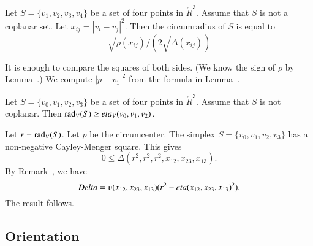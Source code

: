 \begin{tarskidata}
\begin{tarski}

\begin{lemma}
Let $S=\{v_1,v_2,v_3,v_4\}$ be a set of four points in $\ring{R}^3$.
Assume that $S$ is not a coplanar set.  
Let $x_{ij}=|v_i-v_j|^2$.
Then the circumradius of
	$S$ is equal to 
		$$
		\sqrt{\rho(x_{ij})}/
		(2\sqrt{\Delta(x_{ij})})
		$$
\end{lemma}

\begin{proved} It is enough to compare the
squares of both sides.  (We know the sign of
$\rho$ by Lemma~.)  We
compute $|p-v_1|^2$ from the formula
in Lemma~.
\swallowed\end{proved}
\end{tarski}




\begin{tarski}

\begin{lemma}
Let $S=\{v_0,v_1,v_2,v_3\}$ be a set of four points in $\ring{R}^3$.
Assume that $S$ is not coplanar.
Then $\operatorname{rad}_V(S) \ge eta_V(v_0,v_1,v_2)$.
\end{lemma}

\begin{proved}  Let $r=\operatorname{rad}_V(S)$.  Let $p$ be the circumcenter.
The simplex $S=\{v_0,v_1,v_2,v_3\}$ has a non-negative 
Cayley-Menger
square.  This gives
  $$
  0\le \Delta(r^2,r^2,r^2,x_{12},x_{23},x_{13}).
  $$
By Remark~, we have
$$
\Delta = \ups(x_{12},x_{23},x_{13}) (r^2 - \eta(x_{12},x_{23},x_{13})^2).
$$
The result follows.
\swallowed\end{proved}
\end{tarski}








\begin{tarski}
\section{Orientation}


\end{tarski}
\end{tarskidata}
